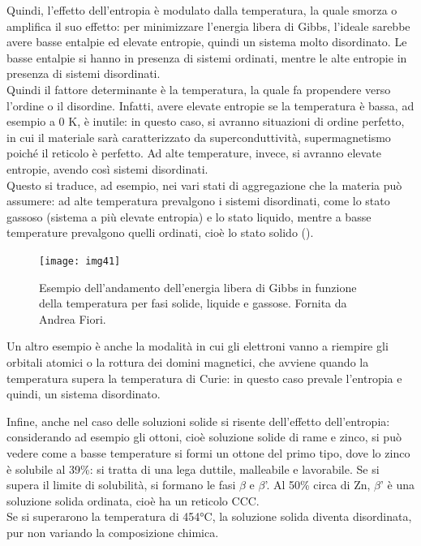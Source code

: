 Quindi, l’effetto dell’entropia è modulato dalla temperatura, la quale smorza o amplifica il suo effetto: per minimizzare l’energia libera di Gibbs, l’ideale sarebbe avere basse entalpie ed elevate entropie, quindi un sistema molto disordinato. 
Le basse entalpie si hanno in presenza di sistemi ordinati, mentre le alte entropie in presenza di sistemi disordinati.\\
Quindi il fattore determinante è la temperatura, la quale fa propendere verso l’ordine o il disordine. Infatti, avere elevate entropie se la temperatura è bassa, ad esempio a 0 K, è inutile: in questo caso, si avranno situazioni di ordine perfetto, in cui il materiale sarà caratterizzato da superconduttività, supermagnetismo poiché il reticolo è perfetto.
Ad alte temperature, invece, si avranno elevate entropie, avendo così sistemi disordinati.\\
Questo si traduce, ad esempio, nei vari stati di aggregazione che la materia può assumere: ad alte temperatura prevalgono i sistemi disordinati, come lo stato gassoso (sistema a più elevate entropia) e lo stato liquido, mentre a basse temperature prevalgono quelli ordinati, cioè lo stato solido ().
\begin{figure}[!hbt]
    \texttt{[image: img41]}
    \caption{Esempio dell'andamento dell'energia libera di Gibbs in funzione della temperatura per fasi solide, liquide e gassose. Fornita da Andrea Fiori.}
\end{figure}

Un altro esempio è anche la modalità in cui gli elettroni vanno a riempire gli orbitali atomici o la rottura dei domini magnetici, che avviene quando la temperatura supera la temperatura di Curie: in questo caso prevale l’entropia e quindi, un sistema disordinato.

Infine, anche nel caso delle soluzioni solide si risente dell’effetto dell’entropia: considerando ad esempio gli ottoni, cioè soluzione solide di rame e zinco, si può vedere come a basse temperature si formi un ottone del primo tipo, dove lo zinco è solubile al 39\%: si tratta di una lega duttile, malleabile e lavorabile. Se si supera il limite di solubilità, si formano le fasi $\beta$ e $\beta$’. Al 50\% circa di Zn, $\beta$’ è una soluzione solida ordinata, cioè ha un reticolo CCC.\\
Se si superarono la temperatura di 454°C, la soluzione solida diventa disordinata, pur non variando la composizione chimica.

